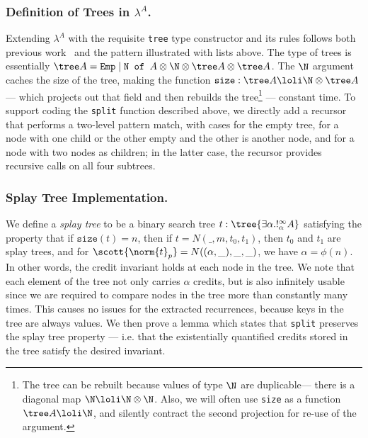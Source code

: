 \subsubsection{Definition of Trees in $\lambda^A$.}
Extending $\lambda^A$ with the requisite \texttt{tree} type constructor and its rules follows both previous work~\cite{danner-et-al:icfp15}
and the pattern illustrated with lists above.
The type of trees is essentially $\tree A = \texttt{Emp} \; | \; \texttt{N of } A \otimes \N \otimes \tree A \otimes \tree A $.
The $\N$ argument caches the size of the tree, making the function $\texttt{size} : \tree A \loli \N \otimes \tree A$ --- which projects out that field and then rebuilds the tree\footnote{The tree can be rebuilt   because values of type $\N$ are duplicable--- there is a diagonal map   $\N \loli \N \otimes \N$. Also, we will often use \texttt{size} as a   function $\tree A \loli \N$, and silently contract the second   projection for re-use of the argument.} --- constant time.
To support coding the \texttt{split} function described above, we directly add a recursor that performs a two-level pattern match,
with cases for the empty tree, for a node with one child or the other empty and the other is another node, and for a node with two nodes as children; in the latter case, the recursor provides recursive calls on
all four subtrees.  


\subsubsection{Splay Tree Implementation.}
We define a \textit{splay tree} to be a binary search tree $t : \tree {\exists \alpha. !^\infty_\alpha A}$ satisfying the property that if $\texttt{size}(t) = n$, then if $t = N(\_,m,t_0,t_1)$, then $t_0$ and $t_1$ are splay trees, and for $\scott{\norm{t}_p} = N((\alpha,\_),\_,\_)$, we have $\alpha = \phi(n)$.
In other words, the credit invariant holds at each node in the tree. We note that each element of the tree not only carries $\alpha$ credits, but is also infinitely usable since we are required to compare nodes in the tree more than constantly many times. This causes no issues for the extracted recurrences, because keys in the tree are always values. We then prove a lemma which states that \texttt{split} preserves the splay tree property --- i.e. that the existentially quantified credits stored in the tree satisfy the desired invariant.  

